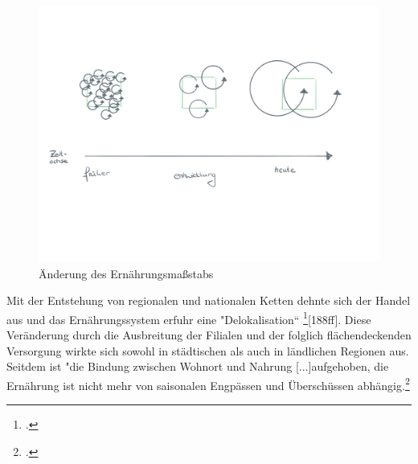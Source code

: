 \documentclass{scrartcl}
\begin{document}
\begin{figure}[htbp]
\centering
\includegraphics[width=12cm]{image_folder/ernahrung.png}
\caption{Änderung des Ernährungsmaßstabs}
\label{fig:massstab}
\end{figure}

Mit der Entstehung von regionalen und nationalen Ketten dehnte sich der Handel aus und das Ernährungssystem erfuhr eine "Delokalisation“ \footcite{MASSIMOMONTANARI1993DerEuropa}[188ff]. Diese Veränderung durch die Ausbreitung der Filialen und der folglich flächendeckenden Versorgung wirkte sich sowohl in städtischen als auch in ländlichen Regionen aus. Seitdem ist "die Bindung zwischen Wohnort und Nahrung [...]aufgehoben, die Ernährung ist nicht mehr von saisonalen Engpässen und Überschüssen abhängig.\footcite{Stierand2008StadtLebensmittel, S.122f}  
\end{document}

